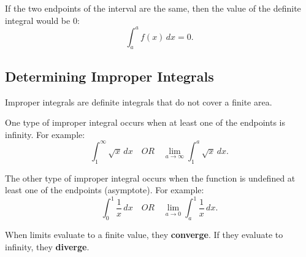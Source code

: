 \documentclass[12pt]{article}
\begin{document}
If the two endpoints of the interval are the same, then the value of the definite integral would be $0$:
\[ \int_{a}^{a} f(x) \, dx = 0. \]

\subsection{Determining Improper Integrals}
\noindent Improper integrals are definite integrals that do not cover a finite area.

One type of improper integral occurs when at least one of the endpoints is infinity. For example:
\[ \int_{1}^{\infty} \sqrt{x} \, dx \quad OR \quad \lim_{a \to \infty} \int_{1}^{a} \sqrt{x} \, dx. \]

The other type of improper integral occurs when the function is undefined at least one of the endpoints (asymptote). For example:
\[ \int_{0}^{1} \frac{1}{x} \, dx \quad OR \quad \lim_{a \to 0} \int_{a}^{1} \frac{1}{x} \, dx. \]

When limits evaluate to a finite value, they \textbf{converge}. If they evaluate to infinity, they \textbf{diverge}.
\end{document}
